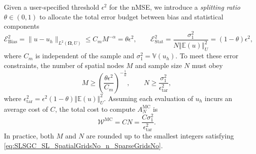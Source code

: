 Given a user-specified threshold $\epsilon^2$  for the nMSE, we introduce a {\it splitting ratio} $\theta \in (0,1)$ to allocate the total error budget between bias and statistical components
%
\begin{equation} \label{eq:error-budget}
\mathcal{E}_{\text{Bias}}^2=\|u-u_h\|_{L^2(\boldsymbol \Omega,U)}\le C_mM^{-\alpha}= \theta\epsilon^2, \quad\quad \mathcal{E}_{\text{Stat}}^2 = \frac{\sigma_1^2}{N\left\Vert\mathbb{E}(u) \right\Vert_{U}^2}=(1-\theta)\epsilon^2,
\end{equation}
where $C_m$ is independent of the sample and $\sigma_1^2 = \mathbb{V}\left( u_{h}\right)$. To meet these error constraints, the number of spatial nodes $M$ and sample size $N$ must obey
%
\begin{equation}
\label{eq:SLSGC_SL_SpatialGridsNo_n_SparseGridsNo}
M\ge \left(\frac{\theta\epsilon^2}{C_m}\right)^{-\frac 1 {\alpha}},\quad\quad  N \ge  \frac{\sigma_1^2}{\epsilon_{\text{tar}}^2},
\end{equation}
%
where $\epsilon_{\text{tar}}^2 = \epsilon^2(1-\theta)\left\Vert\mathbb{E}(u) \right\Vert_{U}^2$.
Assuming each evaluation of $u_{h}$ incurs an average cost of $C$, the total cost to compute $A^{\text{MC}}_{N}$ is
%
\[
\mathcal{W}^\text{MC}  = CN=\frac{C\sigma_1^2}{\epsilon_{\text{tar}}^2}.
\]
%
In practice, both $M$ and $N$ are rounded up to the smallest integers satisfying \eqref{eq:SLSGC_SL_SpatialGridsNo_n_SparseGridsNo}.